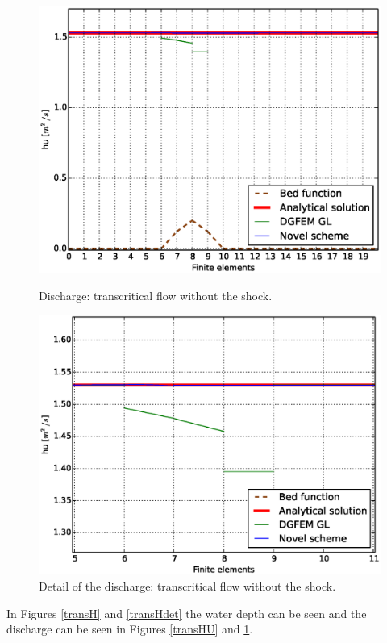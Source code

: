 								\begin{figure}[!ht]
								\centering
								 \begin{minipage}[t]{0.44\textwidth}
								    \begin{center}
								    \includegraphics[width=1.0\textwidth]{OBR/bump/transHU.eps}
								    \caption{Discharge: transcritical flow without the shock.}
								    \label{transHU}
								    \end{center}
								\end{minipage}\hspace{15mm}
								\begin{minipage}[t]{0.44\textwidth}
								    \begin{center}
								    \includegraphics[width=1.0\textwidth]{OBR/bump/transHUdet.eps}
								    \caption{Detail of the discharge: transcritical flow without the shock.}
								    \label{transHUdet}
								    \end{center}
								\end{minipage}
				\end{figure}
In Figures \ref{transH} and \ref{transHdet} the water depth can be seen and the discharge can be seen in Figures \ref{transHU} and \ref{transHUdet}.

